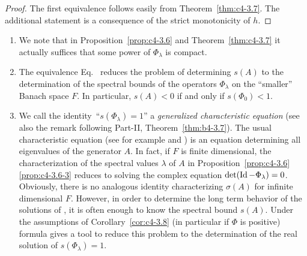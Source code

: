\begin{proof}
The first equivalence follows easily from Theorem~\ref{thm:c4-3.7}. 
The additional statement is a consequence of the strict monotonicity of\/ $h$.
\end{proof}
\begin{remarks*}\label{rem:c4-3.0-kgk}
%
\begin{enumerate}[\upshape (i), wide, labelindent=.25em] 
\item \label{rem:c4-3.1-1}
We note that in Proposition~\ref{prop:c4-3.6} and Theorem~\ref{thm:c4-3.7} it actually suffices that some power of\/ $\Phi_{\lambda}$ is compact.

\item \label{rem:c4-3.1-2}
The equivalence Eq.~ reduces the problem of determining $s(A)$ to the determination of the spectral bounds of the operators $\Phi_{\lambda}$ on the \enquote{smaller} Banach space $F$.
In particular, $s(A) < 0$ if and only if\/ $s(\Phi_{0}) < 1$.

\item \label{rem:c4-3.1-3}
We call the identity\, \enquote{$s(\Phi_{\lambda}) = 1$} a \emph{generalized characteristic equation} (see also the remark following Part-II, Theorem~\ref{thm:b4-3.7}). The usual characteristic equation (see for example  \textcite[p.168ff]{hale:1977} and \textcite[Section~5]{heijmans:1985b})
is an equation determining all eigenvalues of the generator $A$. 
In fact, if\/ $F$ is finite dimensional, the characterization of the spectral values $\lambda$ of\/ $A$ in Proposition~\ref{prop:c4-3.6}\,\ref{prop:c4-3.6-3} reduces to solving the complex equation $\det(\operatorname{Id} - \Phi_{\lambda}) = 0$. 
Obviously, there is no analogous identity characterizing $\sigma(A)$ for infinite dimensional $F$. 
However, in order to determine the long term behavior of the solutions of , it is often enough to know the spectral bound $s(A)$. 
Under the assumptions of Corollary~\ref{cor:c4-3.8} (in particular if\/ $\Phi$ is positive) formula  gives a tool to reduce this problem to the determination of the real solution of\/ $s(\Phi_{\lambda}) = 1$.
\end{enumerate}
\end{remarks*}
